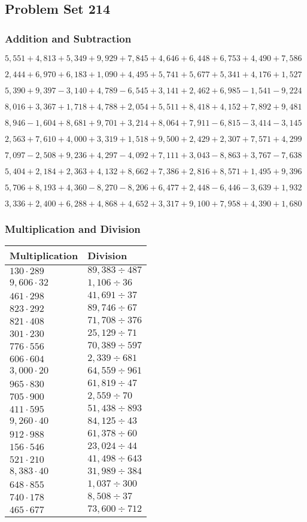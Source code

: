 \hypertarget{problem-set-214}{%
\subsection{Problem Set 214}\label{problem-set-214}}

\hypertarget{addition-and-subtraction}{%
\subsubsection{Addition and
Subtraction}\label{addition-and-subtraction}}

\(5,551+4,813+5,349+9,929+7,845+4,646+6,448+6,753+4,490+7,586\)

\(2,444+6,970+6,183+1,090+4,495+5,741+5,677+5,341+4,176+1,527\)

\(5,390+9,397-3,140+4,789-6,545+3,141+2,462+6,985-1,541-9,224\)

\(8,016+3,367+1,718+4,788+2,054+5,511+8,418+4,152+7,892+9,481\)

\(8,946-1,604+8,681+9,701+3,214+8,064+7,911-6,815-3,414-3,145\)

\(2,563+7,610+4,000+3,319+1,518+9,500+2,429+2,307+7,571+4,299\)

\(7,097-2,508+9,236+4,297-4,092+7,111+3,043-8,863+3,767-7,638\)

\(5,404+2,184+2,363+4,132+8,662+7,386+2,816+8,571+1,495+9,396\)

\(5,706+8,193+4,360-8,270-8,206+6,477+2,448-6,446-3,639+1,932\)

\(3,336+2,400+6,288+4,868+4,652+3,317+9,100+7,958+4,390+1,680\)

\hypertarget{multiplication-and-division}{%
\subsubsection{Multiplication and
Division}\label{multiplication-and-division}}

\begin{longtable}[]{@{}ll@{}}
\toprule
Multiplication & Division\tabularnewline
\midrule
\endhead
\(130\cdot289\) & \(89,383÷487\)\tabularnewline
\(9,606\cdot32\) & \(1,106÷36\)\tabularnewline
\(461\cdot298\) & \(41,691÷37\)\tabularnewline
\(823\cdot292\) & \(89,746÷67\)\tabularnewline
\(821\cdot408\) & \(71,708÷376\)\tabularnewline
\(301\cdot230\) & \(25,129÷71\)\tabularnewline
\(776\cdot556\) & \(70,389÷597\)\tabularnewline
\(606\cdot604\) & \(2,339÷681\)\tabularnewline
\(3,000\cdot20\) & \(64,559÷961\)\tabularnewline
\(965\cdot830\) & \(61,819÷47\)\tabularnewline
\(705\cdot900\) & \(2,559÷70\)\tabularnewline
\(411\cdot595\) & \(51,438÷893\)\tabularnewline
\(9,260\cdot40\) & \(84,125÷43\)\tabularnewline
\(912\cdot988\) & \(61,378÷60\)\tabularnewline
\(156\cdot546\) & \(23,024÷44\)\tabularnewline
\(521\cdot210\) & \(41,498÷643\)\tabularnewline
\(8,383\cdot40\) & \(31,989÷384\)\tabularnewline
\(648\cdot855\) & \(1,037÷300\)\tabularnewline
\(740\cdot178\) & \(8,508÷37\)\tabularnewline
\(465\cdot677\) & \(73,600÷712\)\tabularnewline
\bottomrule
\end{longtable}
